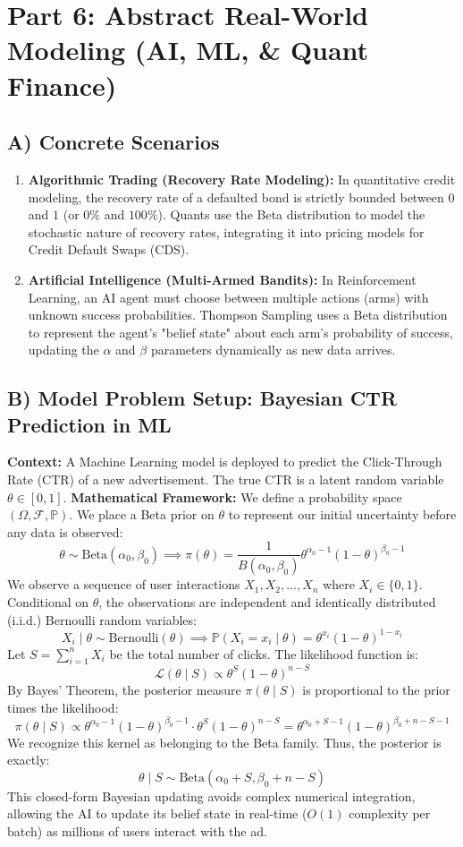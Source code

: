 \documentclass[11pt, a4paper]{article}
\theoremstyle{definition}
\theoremstyle{remark}
\newcommand{\Prob}{\mathbb{P}}
\newcommand{\F}{\mathcal{F}}
\begin{document}
\section{Part 6: Abstract Real-World Modeling (AI, ML, \& Quant Finance)}

\subsection{A) Concrete Scenarios}
\begin{enumerate}
    \item \textbf{Algorithmic Trading (Recovery Rate Modeling):} In quantitative credit modeling, the recovery rate of a defaulted bond is strictly bounded between $0$ and $1$ (or $0\%$ and $100\%$). Quants use the Beta distribution to model the stochastic nature of recovery rates, integrating it into pricing models for Credit Default Swaps (CDS).
    \item \textbf{Artificial Intelligence (Multi-Armed Bandits):} In Reinforcement Learning, an AI agent must choose between multiple actions (arms) with unknown success probabilities. Thompson Sampling uses a Beta distribution to represent the agent's "belief state" about each arm's probability of success, updating the $\alpha$ and $\beta$ parameters dynamically as new data arrives.
\end{enumerate}

\subsection{B) Model Problem Setup: Bayesian CTR Prediction in ML}
\textbf{Context:} A Machine Learning model is deployed to predict the Click-Through Rate (CTR) of a new advertisement. The true CTR is a latent random variable $\theta \in [0,1]$. 
\textbf{Mathematical Framework:}
We define a probability space $(\Omega, \F, \Prob)$. We place a Beta prior on $\theta$ to represent our initial uncertainty before any data is observed:
\[
\theta \sim \text{Beta}(\alpha_0, \beta_0) \implies \pi(\theta) = \frac{1}{B(\alpha_0, \beta_0)} \theta^{\alpha_0-1}(1-\theta)^{\beta_0-1}
\]
We observe a sequence of user interactions $X_1, X_2, \dots, X_n$ where $X_i \in \{0, 1\}$. Conditional on $\theta$, the observations are independent and identically distributed (i.i.d.) Bernoulli random variables:
\[
X_i \mid \theta \sim \text{Bernoulli}(\theta) \implies \Prob(X_i = x_i \mid \theta) = \theta^{x_i}(1-\theta)^{1-x_i}
\]
Let $S = \sum_{i=1}^n X_i$ be the total number of clicks. The likelihood function is:
\[
\mathcal{L}(\theta \mid S) \propto \theta^S (1-\theta)^{n-S}
\]
By Bayes' Theorem, the posterior measure $\pi(\theta \mid S)$ is proportional to the prior times the likelihood:
\[
\pi(\theta \mid S) \propto \theta^{\alpha_0-1}(1-\theta)^{\beta_0-1} \cdot \theta^S (1-\theta)^{n-S} = \theta^{\alpha_0+S-1}(1-\theta)^{\beta_0+n-S-1}
\]
We recognize this kernel as belonging to the Beta family. Thus, the posterior is exactly:
\[
\theta \mid S \sim \text{Beta}(\alpha_0 + S, \beta_0 + n - S)
\]
This closed-form Bayesian updating avoids complex numerical integration, allowing the AI to update its belief state in real-time ($O(1)$ complexity per batch) as millions of users interact with the ad.
\end{document}
